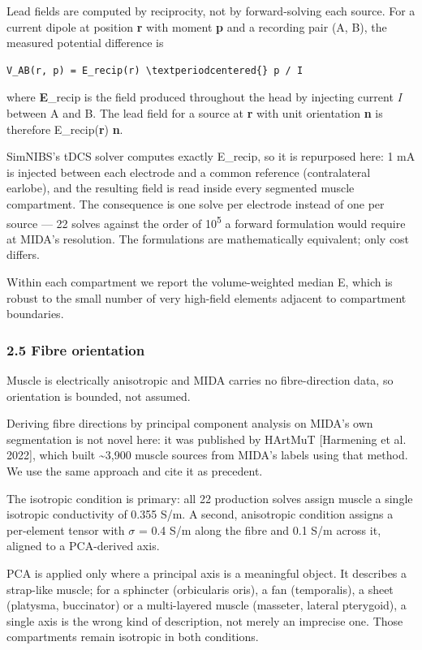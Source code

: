 \documentclass[
  11pt,
  a4paper,
]{article}
\begin{document}
Lead fields are computed by reciprocity, not by forward-solving each source. For
a current dipole at position \textbf{r} with moment \textbf{p} and a recording pair (A,
B), the measured potential difference is

\begin{verbatim}
V_AB(r, p) = E_recip(r) \textperiodcentered{} p / I
\end{verbatim}

where \textbf{E}\_recip is the field produced throughout the head by injecting current
\emph{I} between A and B. The lead field for a source at \textbf{r} with unit orientation
\textbf{n} is therefore E\_recip(\textbf{r}) \textperiodcentered{} \textbf{n}.

SimNIBS's tDCS solver computes exactly E\_recip, so it is repurposed here: 1 mA
is injected between each electrode and a common reference (contralateral
earlobe), and the resulting field is read inside every segmented muscle
compartment. The consequence is one solve per electrode instead of one per
source --- 22 solves against the order of 10\textsuperscript{5} a forward formulation would require
at MIDA's resolution. The formulations are mathematically equivalent; only cost
differs.

Within each compartment we report the volume-weighted median \textbar E\textbar, which is
robust to the small number of very high-field elements adjacent to compartment
boundaries.

\subsubsection{2.5 Fibre orientation}\label{fibre-orientation}

Muscle is electrically anisotropic and MIDA carries no fibre-direction data, so
orientation is bounded, not assumed.

Deriving fibre directions by principal component analysis on MIDA's own
segmentation is not novel here: it was published by HArtMuT {[}Harmening et al.
2022{]}, which built \textasciitilde3,900 muscle sources from MIDA's labels using that method.
We use the same approach and cite it as precedent.

The isotropic condition is primary: all 22 production solves assign muscle a
single isotropic conductivity of 0.355 S/m. A second, anisotropic condition
assigns a per-element tensor with $\sigma$ = 0.4 S/m along the fibre and 0.1 S/m across
it, aligned to a PCA-derived axis.

PCA is applied only where a principal axis is a meaningful object. It describes
a strap-like muscle; for a sphincter (orbicularis oris), a fan (temporalis), a
sheet (platysma, buccinator) or a multi-layered muscle (masseter, lateral
pterygoid), a single axis is the wrong kind of description, not merely an
imprecise one. Those compartments remain isotropic in both conditions.
\end{document}

